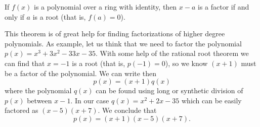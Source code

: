 \documentclass{article}
\begin{document}
If $f(x)$ is a polynomial over a ring with identity, then $x-a$ is a factor if and only if $a$ is a root (that is, $f(a)=0$).

This theorem is of great help for finding factorizations of higher degree polynomials. As example, let us think that we need to factor the polynomial $p(x)=x^3+3x^2-33x-35$. With some help of the rational root theorem we can find that $x=-1$ is a root (that is, $p(-1)=0$), so we know $(x+1)$ must be a factor of the polynomial. We can write then
$$p(x)=(x+1)q(x)$$
where the polynomial $q(x)$ can be found using long or synthetic division of $p(x)$ between $x-1$. In our case $q(x)=x^2+2x-35$ which can be easily factored as $(x-5)(x+7)$. We conclude that
$$p(x)=(x+1)(x-5)(x+7).$$
\end{document}
